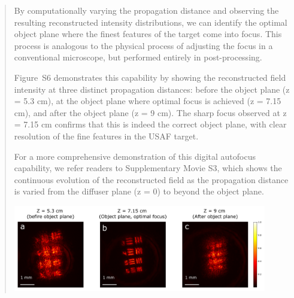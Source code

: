 \documentclass[12pt]{article}
\newenvironment{ourresponse}
    {\begin{tcolorbox}[width=\linewidth,breakable,enhanced,colback=gray!5,colframe=responsecolor!50,title=Response,left=5pt,right=5pt]}
    {\end{tcolorbox}}
\begin{document}
\begin{enumerate}[label=\arabic*.]
\begin{enumerate}[label=3.\alph*.]
\begin{ourresponse}
\begin{quote}
                By computationally varying the propagation distance and observing the resulting reconstructed intensity distributions, we can identify the optimal object plane where the finest features of the target come into focus. This process is analogous to the physical process of adjusting the focus in a conventional microscope, but performed entirely in post-processing.
                
                Figure~S6 demonstrates this capability by showing the reconstructed field intensity at three distinct propagation distances: before the object plane (z = 5.3 cm), at the object plane where optimal focus is achieved (z = 7.15 cm), and after the object plane (z = 9 cm). The sharp focus observed at z = 7.15 cm confirms that this is indeed the correct object plane, with clear resolution of the fine features in the USAF target.
                
                For a more comprehensive demonstration of this digital autofocus capability, we refer readers to Supplementary Movie S3, which shows the continuous evolution of the reconstructed field as the propagation distance is varied from the diffuser plane (z = 0) to beyond the object plane.
        
                \vspace{1em}
                \begin{minipage}{\linewidth}
                    \centering
                    \includegraphics[width=0.9\textwidth]{figures/figure_S6.pdf}
                \end{minipage}
            \end{quote}
        \end{ourresponse}
        

\end{enumerate}
\end{enumerate}
\end{document}
